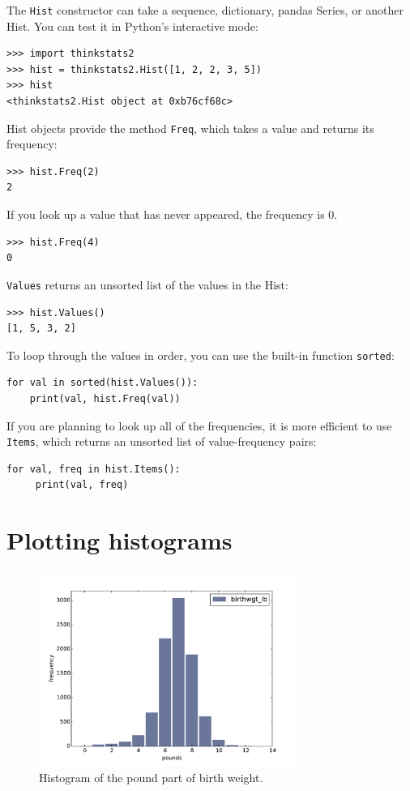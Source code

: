\documentclass[12pt]{book}
\begin{document}
The {\tt Hist} constructor can take a sequence, dictionary, pandas
Series, or another Hist.  You can test it in Python's interactive
mode:
%
\begin{verbatim}
>>> import thinkstats2
>>> hist = thinkstats2.Hist([1, 2, 2, 3, 5])
>>> hist
<thinkstats2.Hist object at 0xb76cf68c>
\end{verbatim}

Hist objects provide the method {\tt Freq}, which takes a value and
returns its frequency:
%
\begin{verbatim}
>>> hist.Freq(2)
2
\end{verbatim}

If you look up a value that has never appeared, the frequency is 0.
%
\begin{verbatim}
>>> hist.Freq(4)
0
\end{verbatim}

{\tt Values} returns an unsorted list of the values in the Hist:
%
\begin{verbatim}
>>> hist.Values()
[1, 5, 3, 2]
\end{verbatim}

To loop through the values in order, you can use the built-in function
{\tt sorted}:
%
\begin{verbatim}
for val in sorted(hist.Values()):
    print(val, hist.Freq(val))
\end{verbatim}

If you are planning to look up all of the frequencies, it is more
efficient to use {\tt Items}, which returns an unsorted list of
value-frequency pairs:
%
\begin{verbatim}
for val, freq in hist.Items():
     print(val, freq)
\end{verbatim}


\section{Plotting histograms}

\begin{figure}
\centerline{\includegraphics[height=2.5in]{figs/first_wgt_lb_hist.pdf}}
\caption{Histogram of the pound part of birth weight.}
\label{first_wgt_lb_hist}
\end{figure}
\end{document}
